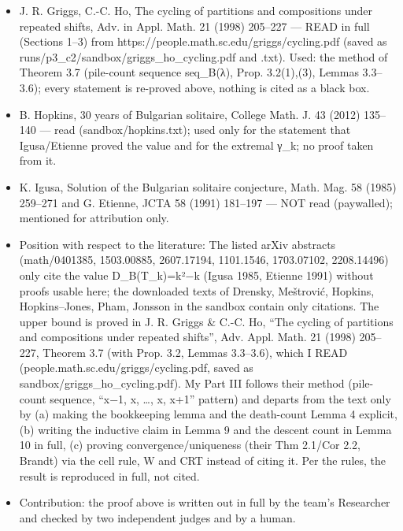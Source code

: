 \begin{itemize}
\tightlist
\item
  J. R. Griggs, C.-C. Ho, The cycling of partitions and compositions
  under repeated shifts, Adv. in Appl. Math. 21 (1998) 205--227 --- READ
  in full (Sections 1--3) from
  https://people.math.sc.edu/griggs/cycling.pdf (saved as
  runs/p3\_c2/sandbox/griggs\_ho\_cycling.pdf and .txt). Used: the
  method of Theorem 3.7 (pile-count sequence seq\_B(λ), Prop.
  3.2(1),(3), Lemmas 3.3--3.6); every statement is re-proved above,
  nothing is cited as a black box.
\item
  B. Hopkins, 30 years of Bulgarian solitaire, College Math. J. 43
  (2012) 135--140 --- read (sandbox/hopkins.txt); used only for the
  statement that Igusa/Etienne proved the value and for the extremal
  γ\_k; no proof taken from it.
\item
  K. Igusa, Solution of the Bulgarian solitaire conjecture, Math. Mag.
  58 (1985) 259--271 and G. Etienne, JCTA 58 (1991) 181--197 --- NOT
  read (paywalled); mentioned for attribution only.
\item
  Position with respect to the literature: The listed arXiv abstracts
  (math/0401385, 1503.00885, 2607.17194, 1101.1546, 1703.07102,
  2208.14496) only cite the value D\_B(T\_k)=k²−k (Igusa 1985, Etienne
  1991) without proofs usable here; the downloaded texts of Drensky,
  Meštrović, Hopkins, Hopkins--Jones, Pham, Jonsson in the sandbox
  contain only citations. The upper bound is proved in J. R. Griggs \&
  C.-C. Ho, ``The cycling of partitions and compositions under repeated
  shifts'', Adv. Appl. Math. 21 (1998) 205--227, Theorem 3.7 (with Prop.
  3.2, Lemmas 3.3--3.6), which I READ
  (people.math.sc.edu/griggs/cycling.pdf, saved as
  sandbox/griggs\_ho\_cycling.pdf). My Part III follows their method
  (pile-count sequence, ``x−1, x, \ldots, x, x+1'' pattern) and departs
  from the text only by (a) making the bookkeeping lemma and the
  death-count Lemma 4 explicit, (b) writing the inductive claim in Lemma
  9 and the descent count in Lemma 10 in full, (c) proving
  convergence/uniqueness (their Thm 2.1/Cor 2.2, Brandt) via the cell
  rule, W and CRT instead of citing it. Per the rules, the result is
  reproduced in full, not cited.
\item
  Contribution: the proof above is written out in full by the team's
  Researcher and checked by two independent judges and by a human.
\end{itemize}


